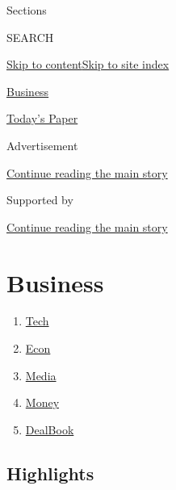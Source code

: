 Sections

SEARCH

\protect\hyperlink{site-content}{Skip to
content}\protect\hyperlink{site-index}{Skip to site index}

\href{https://www.nytimes.com/section/business}{Business}

\href{https://myaccount.nytimes.com/auth/login?response_type=cookie\&client_id=vi}{}

\href{https://www.nytimes.com/section/todayspaper}{Today's Paper}

Advertisement

\protect\hyperlink{after-top}{Continue reading the main story}

Supported by

\protect\hyperlink{after-sponsor}{Continue reading the main story}

\hypertarget{business}{%
\section{Business}\label{business}}

\begin{enumerate}
\def\labelenumi{\arabic{enumi}.}
\tightlist
\item
  \href{/section/technology}{Tech}
\item
  \href{/section/business/economy}{Econ}
\item
  \href{/section/business/media}{Media}
\item
  \href{/section/your-money}{Money}
\item
  \href{/section/business/dealbook}{DealBook}
\end{enumerate}

\hypertarget{highlights}{%
\subsection{Highlights}\label{highlights}}

